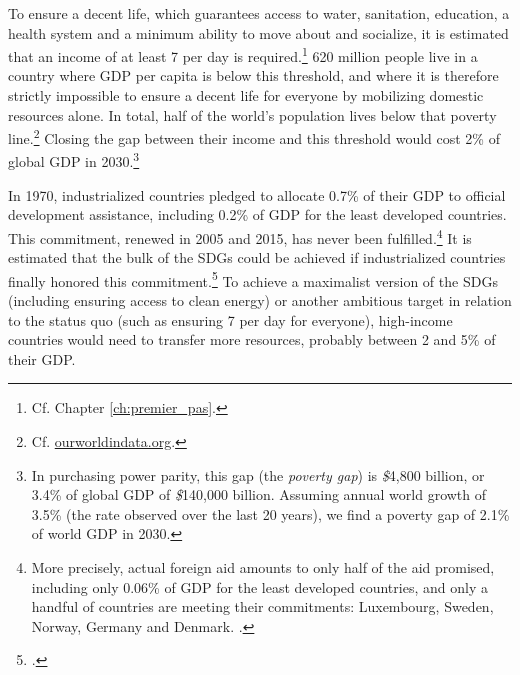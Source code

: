 \documentclass[a5paper,english,openany]{memoir}
\begin{document}
To ensure a decent life, which guarantees access to water, sanitation, education, a health system and a minimum ability to move about and socialize, it is estimated that an income of at least \textit{\texteuro{}}7 per day is required.\footnote{Cf. Chapter \ref{ch:premier_pas}.} 
620 million people live in a country where GDP per capita is below this threshold, and where it is therefore strictly impossible to ensure a decent life for everyone by mobilizing domestic resources alone. 
In total, half of the world's population lives below that poverty line.\footnote{Cf. \href{https://ourworldindata.org/grapher/distribution-of-population-between-different-poverty-thresholds-up-to-30-dollars}{ourworldindata.org}.} Closing the gap between their income and this threshold would cost 2\% of global GDP in 2030.\footnote{In purchasing power parity, this gap (the \textit{poverty gap}) is \textit{\$}4,800 billion, or 3.4\% of global GDP of \textit{\$}140,000 billion. Assuming annual world growth of 3.5\% (the rate observed over the last 20 years), we find a poverty gap of 
2.1\% of world GDP in 2030.} %

In 1970, industrialized countries pledged to allocate 0.7\% of their GDP to official development assistance, including 0.2\% of GDP for the least developed countries. This commitment, renewed in 2005 and 2015, has never been fulfilled.\footnote{More precisely, actual foreign aid amounts to only half of the aid promised, including only 0.06\% of GDP for the least developed countries, and only a handful of countries are meeting their commitments: Luxembourg, Sweden, Norway, Germany and Denmark. 
\citep{oecd_oda_2023}.} 
It is estimated that the bulk of the SDGs could be achieved if industrialized countries finally honored this commitment.\footnote{\citet{sdsn_sdg_2019}.} To achieve a maximalist version of the SDGs (including ensuring access to clean energy) or another ambitious target in relation to the status quo (such as ensuring \textit{\texteuro{}}7 per day for everyone), high-income countries would need to transfer more resources, probably between 2 and 5\% of their GDP.%
\end{document}
